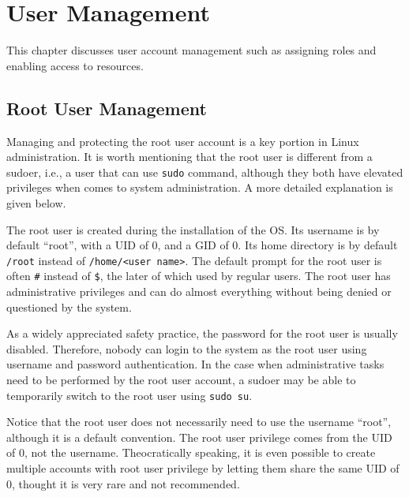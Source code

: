\chapter{User Management} \label{ch:usermanagement}

This chapter discusses user account management such as assigning roles and enabling access to resources.

\section{Root User Management}

Managing and protecting the root user account is a key portion in Linux administration. It is worth mentioning that the root user is different from a sudoer, i.e., a user that can use \verb|sudo| command, although they both have elevated privileges when comes to system administration. A more detailed explanation is given below.

The root user is created during the installation of the OS. Its username is by default ``root'', with a UID of 0, and a GID of 0. Its home directory is by default \verb|/root| instead of \verb|/home/<user name>|. The default prompt for the root user is often \verb|#| instead of \verb|$|, the later of which used by regular users. The root user has administrative privileges and can do almost everything without being denied or questioned by the system. 

As a widely appreciated safety practice, the password for the root user is usually disabled. Therefore, nobody can login to the system as the root user using username and password authentication. In the case when administrative tasks need to be performed by the root user account, a sudoer may be able to temporarily switch to the root user using \verb|sudo su|.

Notice that the root user does not necessarily need to use the username ``root'', although it is a default convention. The root user privilege comes from the UID of 0, not the username. Theocratically speaking, it is even possible to create multiple accounts with root user privilege by letting them share the same UID of 0, thought it is very rare and not recommended.

